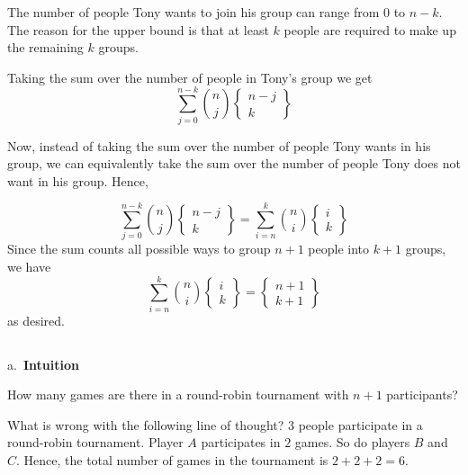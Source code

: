 \documentclass[]{book}
\begin{document}
The number of people Tony wants to join his group can range from \(0\)
to \(n-k\). The reason for the upper bound is that at least \(k\) people
are required to make up the remaining \(k\) groups.

Taking the sum over the number of people in Tony's group we get
\[\sum_{j=0}^{n-k}{n \choose j}\left\{
    \begin{array}{cc}
        n-j\\
        k
    \end{array}
  \right\}
  \]

Now, instead of taking the sum over the number of people Tony wants in
his group, we can equivalently take the sum over the number of people
Tony does not want in his group. Hence,

\[\sum_{j=0}^{n-k}{n \choose j}\left\{
      \begin{array}{cc}
          n-j\\
          k
      \end{array}
    \right\} = \sum_{i=n}^{k}{n \choose i}\left\{
      \begin{array}{cc}
          i\\
          k
      \end{array}
    \right\}
  \] Since the sum counts all possible ways to group \(n+1\) people into
\(k+1\) groups, we have \[
\sum_{i=n}^{k}{n \choose i}\left\{
      \begin{array}{cc}
          i\\
          k
      \end{array}
    \right\} = 
    \left\{
      \begin{array}{cc}
          n+1\\
          k+1
      \end{array}
    \right\}
\] as desired.

\subsection{}\label{section-21}

a.~\textbf{Intuition}

How many games are there in a round-robin tournament with \(n+1\)
participants?

What is wrong with the following line of thought? \(3\) people
participate in a round-robin tournament. Player \(A\) participates in
\(2\) games. So do players \(B\) and \(C\). Hence, the total number of
games in the tournament is \(2 + 2 + 2 = 6\).
\end{document}
